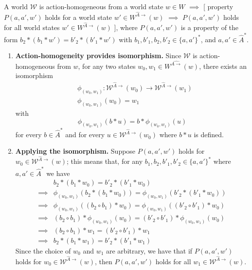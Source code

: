\begin{propositionE}
    \label{prp:action_homogeneous_means_properties_for_w_hold_for_all_reachable_subworld}
    A world $\mathscr{W}$ is action-homogeneous from a world state $w \in W$ $\implies$ [ property $P(a, a', w')$ holds for a world state $w' \in W^{\hat{A}\to}(w)$ $\implies$ $P(a, a', w')$ holds for all world states $w' \in W^{\hat{A}\to}(w)$ ], where $P(a, a', w')$ is a property of the form $b_{2} \ast (b_{1} \ast w') = b'_{2} \ast (b'_{1} \ast w')$ with $b_{1}, b'_{1}, b_{2}, b'_{2} \in \{a, a'\}^{*}$, and $a, a' \in \hat{A}^{*}$.
\end{propositionE}
\begin{proofE}
\begin{enumerate}[(1)]
    \item \textbf{Action-homogeneity provides isomorphism.}
    Since $\mathscr{W}$ is action-homogeneous from $w$, for any two states $w_{0}, w_{1} \in W^{\hat{A\to}}(w)$, there exists an isomorphism
    \begin{align}
        & \phi_{(w_{0}, w_{1})}: \mathscr{W}^{\hat{A}\to}(w_{0}) \to \mathscr{W}^{\hat{A}\to}(w_{1}) \\
        & \phi_{(w_{0}, w_{1})}(w_{0}) = w_{1}
    \end{align}
    with
    \begin{equation}
        \phi_{(w_{0}, w_{1})}(b \ast u) = b \ast \phi_{(w_{0}, w_{1})}(u)
    \end{equation}
    for every $b \in \hat{A}^{*}$ and for every $u \in \mathscr{W}^{\hat{A}\to}(w_{0})$ where $b \ast u$ is defined.

    \item \textbf{Applying the isomorphism.}
    Suppose $P(a, a', w')$ holds for $w_{0} \in \mathscr{W}^{\hat{A}\to}(w)$; this means that, for any $b_{1}, b_{2}, b'_{1}, b'_{2} \in \{a, a'\}^{*}$ where $a,a' \in \hat{A}^{*}$ we have
    \begin{align}
        & b_{2} \ast (b_{1} \ast w_{0}) = b'_{2} \ast (b'_{1} \ast w_{0}) \\
        \implies & \phi_{(w_{0}, w_{1})}(b_{2} \ast (b_{1} \ast w_{0})) = \phi_{(w_{0}, w_{1})}(b'_{2} \ast (b'_{1} \ast w_{0})) \\
        \implies & \phi_{(w_{0}, w_{1})}((b_{2} \circ b_{1}) \ast w_{0}) = \phi_{(w_{0}, w_{1})}((b'_{2} \circ b'_{1}) \ast w_{0}) \\
        \implies & (b_{2} \circ b_{1}) \ast \phi_{(w_{0}, w_{1})}(w_{0}) = (b'_{2} \circ b'_{1}) \ast \phi_{(w_{0}, w_{1})}(w_{0}) \\
        \implies & (b_{2} \circ b_{1}) \ast w_{1} = (b'_{2} \circ b'_{1}) \ast w_{1} \\
        \implies & b_{2} \ast (b_{1} \ast w_{1}) = b'_{2} \ast (b'_{1} \ast w_{1})
    \end{align}
    Since the choice of $w_{0}$ and $w_{1}$ are arbitrary, we have that if $P(a, a', w')$ holds for $w_{0} \in \mathscr{W}^{\hat{A}\to}(w)$, then $P(a, a', w')$ holds for all $w_{1} \in \mathscr{W}^{\hat{A}\to}(w)$.
\end{enumerate}
\end{proofE}

